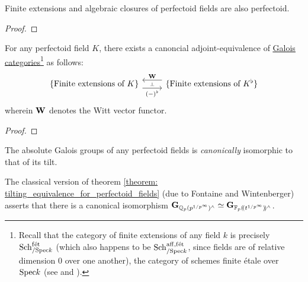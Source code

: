                 \begin{lemma}
                    Finite extensions and algebraic closures of perfectoid fields are also perfectoid.  
                \end{lemma}
                    \begin{proof}
                        
                    \end{proof}
                \begin{theorem} \label{theorem: tilting_equivalence_for_perfectoid_fields}
                    For any perfectoid field $K$, there exists a canoncial adjoint-equivalence of \href{https://stacks.math.columbia.edu/tag/0BMQ}{\underline{Galois categories}}\footnote{Recall that the category of finite extensions of any field $k$ is precisely $\mathrm{Sch}_{/\mathrm{Spec} k}^{\mathrm{f\acute{e}t}}$ (which also happens to be $\mathrm{Sch}_{/\mathrm{Spec} k}^{\mathrm{aff}, \mathrm{f\acute{e}t}}$, since fields are of relative dimension $0$ over one another), the category of schemes finite \'etale over $\mathrm{Spec} k$ (see \cite[\href{https://stacks.math.columbia.edu/tag/0BL6}{Tag 0BL6}]{stacks} and \cite[\href{https://stacks.math.columbia.edu/tag/00U3}{Tag 00U3}]{stacks}).} as follows:
                        $$
                            \begin{tikzcd}
                            	{\{\text{Finite extensions of $K$}\}} & {\{\text{Finite extensions of $K^{\flat}$}\}}
                            	\arrow[""{name=0, anchor=center, inner sep=0}, "{(-)^{\flat}}"', shift right=2, from=1-1, to=1-2]
                            	\arrow[""{name=1, anchor=center, inner sep=0}, "\W"', shift right=2, from=1-2, to=1-1]
                            	\arrow["\dashv"{anchor=center, rotate=-90}, draw=none, from=1, to=0]
                            \end{tikzcd}
                        $$
                    wherein $\mathbf{W}$ denotes the Witt vector functor.
                \end{theorem}
                    \begin{proof}
                        
                    \end{proof}
                \begin{corollary}
                    The absolute Galois groups of any perfectoid fields is \textit{canonically} isomorphic to that of its tilt.
                \end{corollary}
                \begin{example}
                    The classical version of theorem \ref{theorem: tilting_equivalence_for_perfectoid_fields} (due to Fontaine and Wintenberger) asserts that there is a canonical isomorphism $\mathbf{G}_{ \mathbb{Q}_p(p^{1/p^{\infty}})^{\wedge} } \simeq \mathbf{G}_{ \mathbb{F}_p(\!(t^{1/p^{\infty}})\!)^{\wedge} }$.
                \end{example}
                
